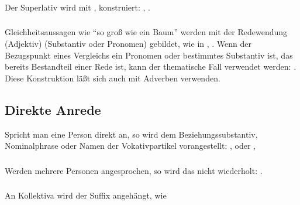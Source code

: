 \subsubsection{} Der Superlativ wird mit , 
konstruiert: ,
.

\subsubsection{} Gleichheitsaussagen wie "`so gro\ss{} wie ein Baum"' werden mit
der Redewendung  (Adjektiv)  (Substantiv oder Pronomen)
gebildet, wie in ,
. Wenn der Bezugspunkt eines Vergleichs ein Pronomen oder
bestimmtes Substantiv ist, das bereits Bestandteil einer Rede ist, kann der thematische
Fall verwendet werden: . Diese
Konstruktion l\"a\ss{}t sich auch mit Adverben verwenden.\label{syntax:adj-eql-comp}


\subsection{Direkte Anrede} Spricht man eine Person direkt an, so wird dem
Beziehungssubstantiv, Nominalphrase oder Namen der Vokativpartikel 
vorangestellt: ,
 oder
, 

\subsubsection{} Werden mehrere Personen angesprochen, so wird das  nicht
wiederholt:  .

\subsubsection{} An Kollektiva wird der Suffix  angeh\"angt, wie
 


